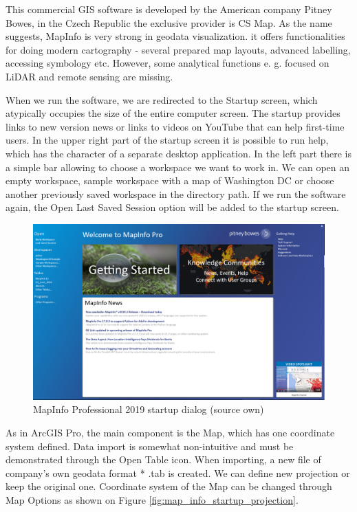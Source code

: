 \documentclass[a4paper,10pt,twoside]{article}
\begin{document}
\noindent This commercial GIS software is developed by the American company Pitney Bowes, in the Czech Republic the exclusive provider is CS Map. As the name suggests, MapInfo is very strong in geodata visualization. it offers functionalities for doing modern cartography - several prepared map layouts, advanced labelling, accessing symbology etc. However, some analytical functions e. g. focused on LiDAR and remote sensing are missing.

When we run the software, we are redirected to the Startup screen, which atypically occupies the size of the entire computer screen. The startup provides links to new version news or links to videos on YouTube that can help first-time users. In the upper right part of the startup screen it is possible to run help, which has the character of a separate desktop application. In the left part there is a simple bar allowing to choose a workspace we want to work in. We can open an empty workspace, sample workspace with a map of Washington DC or choose another previously saved workspace in the directory path. If we run the software again, the Open Last Saved Session option will be added to the startup screen.

\vspace{0.3cm}
\begin{figure}[hbt!] 
\begin{center}
\includegraphics[width=14.5cm]{../pictures/map_info_startup_screen.PNG} 
\caption[MapInfo Professional 2019 startup dialog (source own)]{MapInfo Professional 2019 startup dialog (source own)}
\label{fig:map_info_startup_screen}
\end{center}
\end{figure}

\noindent As in ArcGIS Pro, the main component is the Map, which has one coordinate system defined. Data import is somewhat non-intuitive and must be demonstrated through the Open Table icon. When importing, a new file of company's own geodata format * .tab is created. We can define new projection or keep the original one. Coordinate system of the Map can be changed through Map Options as shown on Figure \ref{fig:map_info_startup_projection}. 
\end{document}
